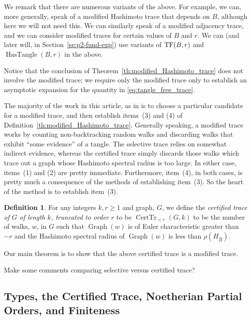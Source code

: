 \documentclass{memo-l}
\newenvironment{jfnote}{ \bgroup \color{blue} }{\egroup}
\newcommand{\mynote}[1]{\begin{jfnote}#1\end{jfnote}}
\newcommand{\TF}{{\rm TF}}
\theoremstyle{plain}
\theoremstyle{definition}
\newtheorem{definition}[theorem]{Definition}
\numberwithin{section}{chapter}
\numberwithin{equation}{chapter}
\DeclareMathOperator{\HasTangle}{HasTangle}
\DeclareMathOperator{\CertTr}{CertTr}
\DeclareMathOperator{\Graph}{Graph}
\theoremstyle{plain}
\theoremstyle{definition}
\begin{document}
{We remark that there are numerous variants of the above.  For example,
we can, more generally, speak
of a modified Hashimoto trace that depends on $B$, although here we
will not need this.  We can similarly speak of a modified adjacency trace,
and we can consider modified traces for certain values of $B$ and $r$.
We can (and later will, in Section~\ref{se:p2-fund-exp}) use variants
of $\TF(B,r)$ and $\HasTangle(B,r)$ in the above.

Notice that the conclusion of
Theorem~\ref{th:modified_Hashimoto_trace} does not involve the modified
trace; we require only the modified trace only to establish an asymptotic
expansion for the quantity in \eqref{eq:tangle_free_trace}.

The majority of the work in this article, as in
\cite{friedman_random_graphs,friedman_alon} is to
choose a particular candidate for a modified trace, and then
establish items~(3) and (4) of Definition~\ref{th:modified_Hashimoto_trace}.
Generally speaking, a modified trace works by counting non-backtracking
random walks and discarding walks that exhibit ``some evidence'' of
a tangle.  The selective trace relies on somewhat indirect evidence,
whereas the certified trace simply discards those walks which trace
out a graph whose Hashimoto spectral radius is too large.
In either case, items~(1) and (2) are pretty immediate.
Furthermore, item~(4), in both cases, is pretty much a consequence
of the methods of establishing item~(3).  So the heart of the method
is to establish item~(3).

\begin{definition} 
For any integers $k,r\ge 1$ and graph, $G$, we define
the {\em certified trace of $G$ of length $k$, truncated to order $r$} to be
$\CertTr_{<r}(G,k)$ to be the number of walks, $w$, in $G$ such that 
$\Graph(w)$ is of Euler characteristic greater than $-r$ and the
Hashimoto spectral radius of $\Graph(w)$ is less than
$\rho(H_{\widehat B})$.
\end{definition}

Our main theorem is to show that the above certified trace is a modified
trace.

\mynote{Make some comments comparing selective versus certified trace?}


\subsection{Types, the Certified Trace,
Noetherian Partial Orders, and Finiteness}

}
\end{document}
